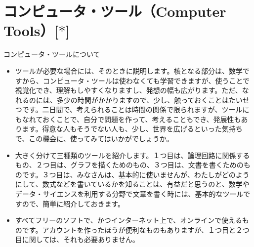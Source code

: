 \documentclass[10pt, dvipdfmx]{beamer}
\begin{document}
\section{コンピュータ・ツール（Computer Tools）\hfill [$\ast$]}
\begin{frame}{コンピュータ・ツールについて}
\begin{itemize}
\item ツールが必要な場合には、そのときに説明します。核となる部分は、数学ですから、コンピュータ・ツールは使わなくても学習できますが、使うことで視覚化でき、理解もしやすくなりますし、発想の幅も広がります。ただ、なれるのには、多少の時間がかかりますので、少し、触っておくことはたいせつです。二日間で、考えられることは時間の関係で限られますが、ツールにもなれておくことで、自分で問題を作って、考えることもでき、発展性もあります。得意な人もそうでない人も、少し、世界を広げるといった気持ちで、この機会に、使ってみてはいかがでしょうか。

\item 大きく分けて三種類のツールを紹介します。１つ目は、論理回路に関係するもの、２つ目は、グラフを描くためのもの、３つ目は、文書を書くためのものです。３つ目は、みなさんは、基本的に使いませんが、わたしがどのようにして、数式などを書いているかを知ることは、有益だと思うのと、数学やデータ・サイエンスを利用する分野で文章を書く時には、基本的なツールですので、簡単に紹介しておきます。

\item すべてフリーのソフトで、かつインターネット上で、オンラインで使えるものです。アカウントを作ったほうが便利なものもありますが、１つ目と２つ目に関しては、それも必要ありません。
\end{itemize}
\end{frame}
\end{document}
